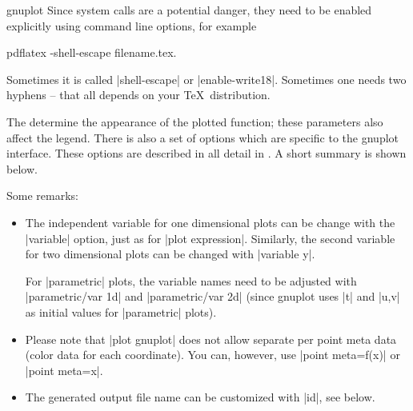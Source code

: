 {\begin{addplotoperation}[]{gnuplot}{}
Since system calls are a potential danger, they need to be enabled explicitly using command line options, for example
\begin{codeexample}
pdflatex -shell-escape filename.tex.
\end{codeexample}
Sometimes it is called |shell-escape| or |enable-write18|. Sometimes one needs two hyphens -- that all depends on your \TeX\ distribution.
\begin{codeexample}[]
\end{codeexample}

\begin{codeexample}[]
\end{codeexample}

The  determine the appearance of the plotted function; these parameters also affect the legend. There is also a set of options which are specific to the gnuplot interface. These options are described in all detail in \cite[section~18.6]{tikz}. A short summary is shown below.


Some remarks:
\begin{itemize}
	\item The independent variable for one dimensional plots can be change with the |variable| option, just as for |plot expression|. Similarly, the second variable for two dimensional plots can be changed with |variable y|.

	For |parametric| plots, the variable names need to be adjusted with |parametric/var 1d| and |parametric/var 2d| (since gnuplot uses |t| and |u,v| as initial values for |parametric| plots).
	\item 
Please note that |plot gnuplot| does not allow separate per point meta data (color data for each coordinate). You can, however, use |point meta=f(x)| or |point meta=x|.

	\item The generated output file name can be customized with |id|, see below.
\end{itemize}


\end{addplotoperation}}

